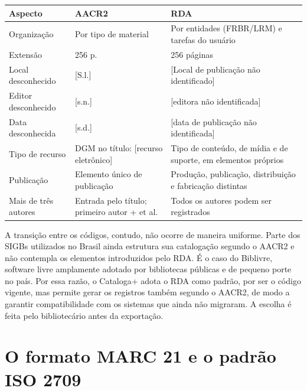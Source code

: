 \begin{quadro}[htb]
    \centering
    \caption{Principais diferenças entre o AACR2 e o RDA na descrição de livros}
    \label{qua:aacr2-rda}
    \footnotesize
    \begin{tabular}{|p{}|p{}|p{}|}
        \hline
        \textbf{Aspecto} & \textbf{AACR2} & \textbf{RDA} \\ \hline
        Organização & Por tipo de material & Por entidades (FRBR/LRM) e tarefas do usuário \\ \hline
        Extensão & 256 p. & 256 páginas \\ \hline
        Local desconhecido & [S.l.] & [Local de publicação não identificado] \\ \hline
        Editor desconhecido & [s.n.] & [editora não identificada] \\ \hline
        Data desconhecida & [s.d.] & [data de publicação não identificada] \\ \hline
        Tipo de recurso & DGM no título: [recurso eletrônico] & Tipo de conteúdo, de mídia e de suporte, em elementos próprios \\ \hline
        Publicação & Elemento único de publicação & Produção, publicação, distribuição e fabricação distintas \\ \hline
        Mais de três autores & Entrada pelo título; primeiro autor + et al. & Todos os autores podem ser registrados \\ \hline
    \end{tabular}
\end{quadro}

A transição entre os códigos, contudo, não ocorre de maneira uniforme. Parte dos SIGBs utilizados no Brasil ainda estrutura sua catalogação segundo o AACR2 e não contempla os elementos introduzidos pelo RDA. É o caso do Biblivre, software livre amplamente adotado por bibliotecas públicas e de pequeno porte no país.
Por essa razão, o Cataloga+ adota o RDA como padrão, por ser o código vigente, mas permite gerar os registros também segundo o AACR2, de modo a garantir compatibilidade com os sistemas que ainda não migraram. A escolha é feita pelo bibliotecário antes da exportação.

\section{O formato MARC 21 e o padrão ISO 2709}
\label{sec:marc}

